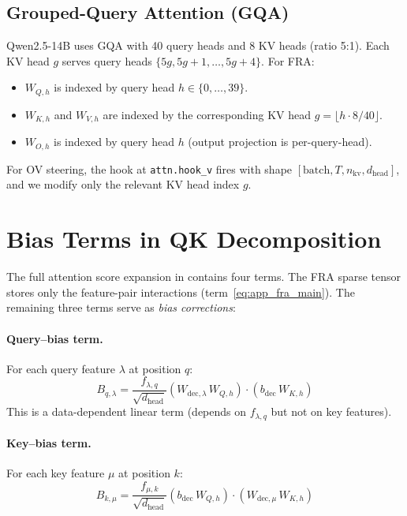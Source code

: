 \documentclass{article}
\theoremstyle{plain}
\theoremstyle{definition}
\theoremstyle{remark}
\newcommand{\dhead}{d_{\mathrm{head}}}
\begin{document}
\subsection{Grouped-Query Attention (GQA)}
\label{app:gqa}

Qwen2.5-14B uses GQA with 40 query heads and 8 KV heads (ratio 5:1). Each KV head $g$ serves query heads $\{5g, 5g+1, \ldots, 5g+4\}$. For FRA:
\begin{itemize}
    \item $W_{Q,h}$ is indexed by query head $h \in \{0, \ldots, 39\}$.
    \item $W_{K,h}$ and $W_{V,h}$ are indexed by the corresponding KV head $g = \lfloor h \cdot 8 / 40 \rfloor$.
    \item $W_{O,h}$ is indexed by query head $h$ (output projection is per-query-head).
\end{itemize}
For OV steering, the hook at \texttt{attn.hook\_v} fires with shape $[\text{batch}, T, n_{\mathrm{kv}}, \dhead]$, and we modify only the relevant KV head index $g$.


\section{Bias Terms in QK Decomposition}
\label{app:bias_terms}

The full attention score expansion in  contains four terms. The FRA sparse tensor stores only the feature-pair interactions (term~\ref{eq:app_fra_main}). The remaining three terms serve as \emph{bias corrections}:

\paragraph{Query--bias term.} For each query feature $\lambda$ at position $q$:
\begin{equation}
    B_{q,\lambda} = \frac{f_{\lambda,q}}{\sqrt{\dhead}} \left( W_{\mathrm{dec},\lambda}\,W_{Q,h} \right) \cdot \left( b_{\mathrm{dec}}\,W_{K,h} \right)
\end{equation}
This is a data-dependent linear term (depends on $f_{\lambda,q}$ but not on key features).

\paragraph{Key--bias term.} For each key feature $\mu$ at position $k$:
\begin{equation}
    B_{k,\mu} = \frac{f_{\mu,k}}{\sqrt{\dhead}} \left( b_{\mathrm{dec}}\,W_{Q,h} \right) \cdot \left( W_{\mathrm{dec},\mu}\,W_{K,h} \right)
\end{equation}
\end{document}
